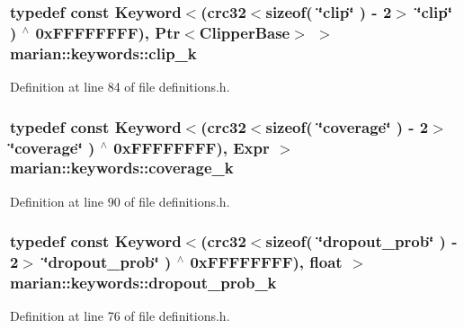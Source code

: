 \subsubsection[{\texorpdfstring{clip\+\_\+k}{clip_k}}]{\setlength{\rightskip}{0pt plus 5cm}typedef const {\bf Keyword}$<$({\bf crc32}$<$sizeof( \char`\"{}clip\char`\"{} ) -\/ 2$>$ \char`\"{}{\bf clip}\char`\"{} ) $^\wedge$ 0x\+F\+F\+F\+F\+F\+F\+F\+F), Ptr$<$\+Clipper\+Base$>$ $>$ marian\+::keywords\+::clip\+\_\+k}\hypertarget{namespacemarian_1_1keywords_a06bef77d1eaa2a3939d9bf156f7e3736}{}\label{namespacemarian_1_1keywords_a06bef77d1eaa2a3939d9bf156f7e3736}


Definition at line 84 of file definitions.\+h.

\subsubsection[{\texorpdfstring{coverage\+\_\+k}{coverage_k}}]{\setlength{\rightskip}{0pt plus 5cm}typedef const {\bf Keyword}$<$({\bf crc32}$<$sizeof( \char`\"{}coverage\char`\"{} ) -\/ 2$>$ \char`\"{}{\bf coverage}\char`\"{} ) $^\wedge$ 0x\+F\+F\+F\+F\+F\+F\+F\+F), Expr $>$ marian\+::keywords\+::coverage\+\_\+k}\hypertarget{namespacemarian_1_1keywords_a458a9fc8abba425be0189dfc25c927e5}{}\label{namespacemarian_1_1keywords_a458a9fc8abba425be0189dfc25c927e5}


Definition at line 90 of file definitions.\+h.

\subsubsection[{\texorpdfstring{dropout\+\_\+prob\+\_\+k}{dropout_prob_k}}]{\setlength{\rightskip}{0pt plus 5cm}typedef const {\bf Keyword}$<$({\bf crc32}$<$sizeof( \char`\"{}dropout\+\_\+prob\char`\"{} ) -\/ 2$>$ \char`\"{}{\bf dropout\+\_\+prob}\char`\"{} ) $^\wedge$ 0x\+F\+F\+F\+F\+F\+F\+F\+F), float $>$ marian\+::keywords\+::dropout\+\_\+prob\+\_\+k}\hypertarget{namespacemarian_1_1keywords_ae28ddaf0d8f158549fa260ef510ec27d}{}\label{namespacemarian_1_1keywords_ae28ddaf0d8f158549fa260ef510ec27d}


Definition at line 76 of file definitions.\+h.

